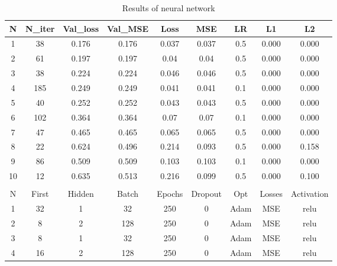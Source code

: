 \documentclass{Trade_template}
\numberwithin{equation}{section}
\begin{document}
\begin{table}[H] \label{Results}
\footnotesize{
\centering
\caption{Results of neural network}
\begin{tabular}{*{9}{c}}
\toprule
N & N\_iter & Val\_loss & Val\_MSE & Loss & MSE & LR & L1 & L2 \\ \midrule
1  & 38            & 0.176     & 0.176                     & 0.037 & 0.037                & 0.5 & 0.000 & 0.000 \\
2  & 61            & 0.197     & 0.197                     & 0.04  & 0.04                 & 0.5 & 0.000 & 0.000 \\
3  & 38            & 0.224     & 0.224                     & 0.046 & 0.046                & 0.5 & 0.000 & 0.000 \\
4  & 185           & 0.249     & 0.249                     & 0.041 & 0.041                & 0.1 & 0.000 & 0.000 \\
5  & 40            & 0.252     & 0.252                     & 0.043 & 0.043                & 0.5 & 0.000 & 0.000 \\
6  & 102           & 0.364     & 0.364                     & 0.07  & 0.07                 & 0.1 & 0.000 & 0.000 \\
7  & 47            & 0.465     & 0.465                     & 0.065 & 0.065                & 0.5 & 0.000 & 0.000 \\
8  & 22            & 0.624     & 0.496                     & 0.214 & 0.093                & 0.5 & 0.000 & 0.158 \\
9  & 86            & 0.509     & 0.509                     & 0.103 & 0.103                & 0.1 & 0.000 & 0.000 \\
10 & 12            & 0.635     & 0.513                     & 0.216 & 0.099                & 0.5 & 0.000 & 0.100 \\ \bottomrule
& & & & & & & &  \\
N & First  & Hidden & Batch & Epochs & Dropout & Opt & Losses & Activation \\ \midrule
1  & 32            & 1              & 32          & 250    & 0       & Adam      & MSE    & relu       \\
2  & 8             & 2              & 128         & 250    & 0       & Adam      & MSE    & relu       \\
3  & 8             & 1              & 32          & 250    & 0       & Adam      & MSE    & relu       \\
4  & 16            & 2              & 128         & 250    & 0       & Adam      & MSE    & relu       \\

\end{tabular}}
\end{table}
\end{document}
